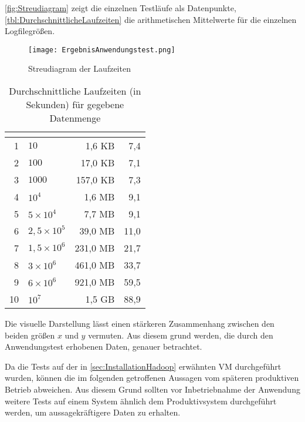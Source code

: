 \autoref{fig:Streudiagram} zeigt die einzelnen Testläufe als Datenpunkte, \autoref{tbl:DurchschnittlicheLaufzeiten} die arithmetischen Mittelwerte für die einzelnen Logfilegrößen.

\begin{figure}
	\centering
	\texttt{[image: ErgebnisAnwendungstest.png]}
	\caption{Streudiagram der Laufzeiten}
	\label{fig:Streudiagram}
\end{figure}

\begin{table}
	\centering
	\begin{tabular}{| r | l | r | r |}
		\hline
		\rowcolor[HTML]{3531FF} 
		\multicolumn{1}{|l|}{\cellcolor[HTML]{4F88BB}{\color[HTML]{FFFFFF} {\bf \#}}} & \multicolumn{1}{l|}{\cellcolor[HTML]{4F88BB}{\color[HTML]{FFFFFF} {\bf Anzahl Einträge}}} & \multicolumn{1}{l|}{\cellcolor[HTML]{4F88BB}{\color[HTML]{FFFFFF} {\bf Dateigröße}}} & \multicolumn{1}{l|}{\cellcolor[HTML]{4F88BB}{\color[HTML]{FFFFFF} {\bf Laufzeit}}} \\ \hline
		1 & $10$ & 1,6 \ac{KB} & 7,4 \\  \hline
		2 & $100$ & 17,0 \ac{KB} & 7,1 \\ \hline
		3 & $1000$ & 157,0 \ac{KB} & 7,3 \\  \hline \hline
		4 & $10^4$ & 1,6 \ac{MB} & 9,1 \\  \hline
		5 & $5\times10^4$ & 7,7 \ac{MB} & 9,1 \\  \hline
		6 & $2,5\times10^5$ & 39,0 \ac{MB} & 11,0 \\  \hline
		7 & $1,5\times10^6$ & 231,0 \ac{MB} & 21,7 \\  \hline
		8 & $3\times10^6$ & 461,0 \ac{MB} & 33,7 \\  \hline
		9 & $6\times10^6$ & 921,0 \ac{MB} & 59,5 \\  \hline \hline
		10 & $10^7$ & 1,5 \ac{GB} & 88,9 \\  \hline
	\end{tabular}
	\caption{Durchschnittliche Laufzeiten (in Sekunden) für gegebene Datenmenge}
	\label{tbl:DurchschnittlicheLaufzeiten}
\end{table}

Die visuelle Darstellung lässt einen stärkeren Zusammenhang zwischen den beiden größen $x$ und $y$ vermuten. Aus diesem grund werden, die durch den Anwendungstest erhobenen Daten, genauer betrachtet.

Da die Tests auf der in \autoref{sec:InstallationHadoop} erwähnten \ac{VM} durchgeführt wurden, können die im folgenden getroffenen Aussagen vom späteren produktiven Betrieb abweichen. Aus diesem Grund sollten vor Inbetriebnahme der Anwendung weitere Tests auf einem System ähnlich dem Produktivsystem durchgeführt werden, um aussagekräftigere Daten zu erhalten.

